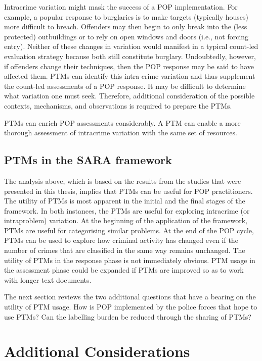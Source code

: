 Intracrime variation might mask the success of a POP implementation. For example, a popular response to burglaries is to make targets (typically houses) more difficult to breach. Offenders may then begin to only break into the (less protected) outbuildings or to rely on open windows and doors (i.e., not forcing entry). Neither of these changes in variation would manifest in a typical count-led evaluation strategy because both still constitute burglary. Undoubtedly, however, if offenders change their techniques, then the POP response may be said to have affected them. PTMs can identify this intra-crime variation and thus supplement the count-led assessments of a POP response. It may be difficult to determine what variation one must seek. Therefore, additional consideration of the possible contexts, mechanisms, and observations is required \parencite{pawson1997realistic} to prepare the PTMs.

PTMs can enrich POP assessments considerably. A PTM can enable a more thorough assessment of intracrime variation with the same set of resources.


\subsection{PTMs in the SARA framework} The analysis above, which is based on the results from the studies that were presented in this thesis, implies that PTMs can be useful for POP practitioners. The utility of PTMs is most apparent in the initial and the final stages of the framework. In both instances, the PTMs are useful for exploring intracrime (or intraproblem) variation. At the beginning of the application of the framework, PTMs are useful for categorising similar problems. At the end of the POP cycle, PTMs can be used to explore how criminal activity has changed even if the number of crimes that are classified in the same way remains unchanged. The utility of PTMs in the response phase is not immediately obvious. PTM usage in the assessment phase could be expanded if PTMs are improved so as to work with longer text documents.

The next section reviews the two additional questions that have a bearing on the utility of PTM usage. How is POP implemented by the police forces that hope to use PTMs? Can the labelling burden be reduced through the sharing of PTMs?

 
\section{Additional Considerations}
